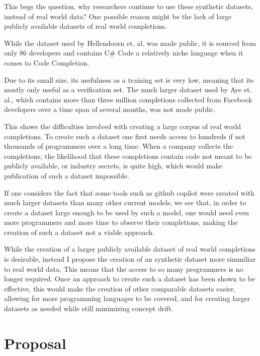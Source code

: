 \documentclass[sigplan,screen,9pt]{acmart}
\begin{document}
This begs the question, why researchers continue to use these synthetic datasets, instead of real world data?
One possible reason might be the lack of large publicly available datasets of real world completions.

While the dataset used by Hellendoorn et. al.\cite{8812116} was made public, it is sourced from only 86 developers and contains C\# Code a relatively niche language when it comes to Code Completion.

Due to its small size, its usefulness as a training set is very low, meaning that its mostly only useful as a verification set.
The much larger dataset used by Aye et. al.\cite{https://doi.org/10.48550/arxiv.2011.04542}, which contains more than three million completions collected from Facebook developers over a time span of several months, was not made public.

This shows the difficulties involved with creating a large corpus of real world completions.
To create such a dataset one first needs access to hundreds if not thousands of programmers over a long time. When a company collects the completions, the likelihood that these completions contain code not meant to be publicly available, or industry secrets, is quite high, which would make publication of such a dataset impossible.

If one considers the fact that some tools such as github copilot were created with much larger datasets than many other current models\cite{2107.03374}, we see that, in order to create a dataset large enough to be used by such a model, one would need even more programmers and more time to observe their completions, making the creation of such a dataset not a viable approach.

While the creation of a larger publicly available dataset of real world completions is desirable, instead I propose the creation of an synthetic dataset more simmiliar to real world data.
This means that the access to so many programmers is no longer required. Once an approach to create such a dataset has been shown to be effective, this would make the creation of other comparable datasets easier, allowing for more programming languages to be covered, and for creating larger datasets as needed while still minimizing concept drift.



\section{Proposal}
\end{document}
